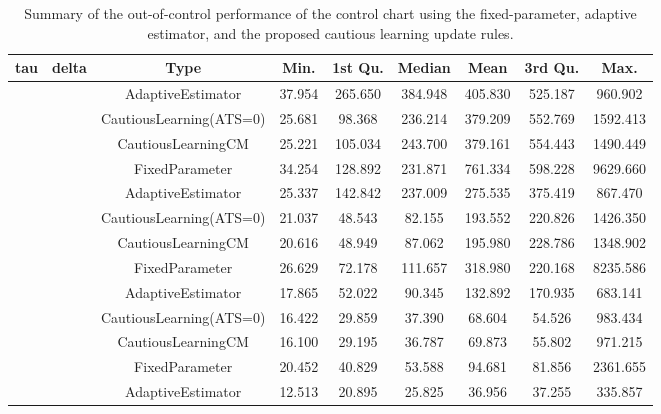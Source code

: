 \begin{table}[!h]

\caption{Summary of the out-of-control performance of the control chart using the fixed-parameter, adaptive estimator, and the proposed cautious learning update rules.}
\centering
\begin{tabular}[t]{ccccccccc}
\toprule
tau & delta & Type & Min. & 1st Qu. & Median & Mean & 3rd Qu. & Max.\\
\midrule
 &  & AdaptiveEstimator & 37.954 & 265.650 & 384.948 & 405.830 & 525.187 & 960.902\\

 &  & CautiousLearning(ATS=0) & 25.681 & 98.368 & 236.214 & 379.209 & 552.769 & 1592.413\\

 &  & CautiousLearningCM & 25.221 & 105.034 & 243.700 & 379.161 & 554.443 & 1490.449\\

 & \multirow[t]{-4}{*}{\centering\arraybackslash 0.25} & FixedParameter & 34.254 & 128.892 & 231.871 & 761.334 & 598.228 & 9629.660\\
\cmidrule{2-9}
 &  & AdaptiveEstimator & 25.337 & 142.842 & 237.009 & 275.535 & 375.419 & 867.470\\

 &  & CautiousLearning(ATS=0) & 21.037 & 48.543 & 82.155 & 193.552 & 220.826 & 1426.350\\

 &  & CautiousLearningCM & 20.616 & 48.949 & 87.062 & 195.980 & 228.786 & 1348.902\\

 & \multirow[t]{-4}{*}{\centering\arraybackslash 0.35} & FixedParameter & 26.629 & 72.178 & 111.657 & 318.980 & 220.168 & 8235.586\\
\cmidrule{2-9}
 &  & AdaptiveEstimator & 17.865 & 52.022 & 90.345 & 132.892 & 170.935 & 683.141\\

 &  & CautiousLearning(ATS=0) & 16.422 & 29.859 & 37.390 & 68.604 & 54.526 & 983.434\\

 &  & CautiousLearningCM & 16.100 & 29.195 & 36.787 & 69.873 & 55.802 & 971.215\\

 & \multirow[t]{-4}{*}{\centering\arraybackslash 0.50} & FixedParameter & 20.452 & 40.829 & 53.588 & 94.681 & 81.856 & 2361.655\\
\cmidrule{2-9}
 &  & AdaptiveEstimator & 12.513 & 20.895 & 25.825 & 36.956 & 37.255 & 335.857\\


\end{tabular}
\end{table}

